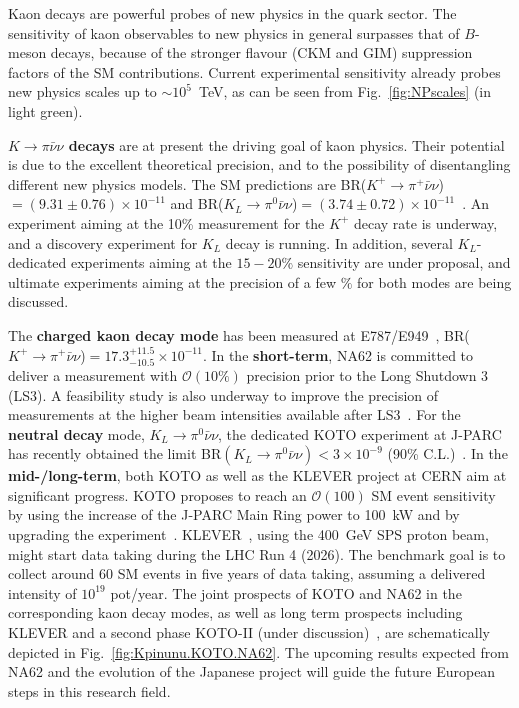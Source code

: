 Kaon decays are powerful probes of new physics in the quark sector. The sensitivity of kaon observables to new physics in general surpasses that of $B$-meson decays, because of the stronger flavour (CKM and GIM) suppression factors of the SM contributions.  
Current experimental sensitivity 
already probes new physics scales 
up to $\sim 10^5$~TeV, as can be seen from Fig.~\ref{fig:NPscales} (in light green). 


\textbf{${K \to \pi \bar \nu \nu}$ decays}   are at present the driving goal of kaon physics. Their potential is due to the excellent theoretical precision, 
and to the possibility of disentangling different new physics models.
The SM predictions are BR($K^+ \to \pi^+ \bar \nu \nu$)$=(9.31 \pm 0.76)\times 10^{-11}$ and 
BR($K_L \to \pi^0 \bar \nu \nu$)$=(3.74 \pm 0.72)\times 10^{-11}$~\cite{Buras:2015qea,SozziESPP19}. 
An experiment aiming at the 10\% measurement for the $K^+$ decay rate is underway, and a discovery experiment for $K_L$ decay is running. 
In addition, several $K_L$-dedicated experiments aiming at the $15-20\%$ sensitivity are under proposal, and ultimate experiments  aiming  at the precision of a few $\%$ for both modes are being discussed.  

The {\bf charged kaon decay mode} 
has been measured at E787/E949~\cite{Artamonov:2009sz},
BR($K^+ \to \pi^+ \bar \nu \nu$)$=17.3^{+11.5}_{-10.5} \times 10^{-11}$. 
In the {\bf short-term}, NA62 is committed to deliver a measurement 
with $\mathcal{O}(10\%)$ precision 
prior to the Long Shutdown 3 (LS3). A feasibility study is also underway
to improve the precision of measurements 
at the higher beam intensities available after LS3~\cite{SozziESPP19,NA62:Lazzeroni}. 
For the {\bf neutral decay} mode, $K_L \to \pi^0 \bar \nu \nu$, the dedicated KOTO experiment at J-PARC 
has recently obtained the limit BR$(K_L \to \pi^0 \bar \nu \nu) < 3 \times 10^{-9}$ (90\% C.L.)~\cite{Ahn:2018mvc}. In the {\bf mid-/long-term}, both KOTO as well as the KLEVER project at CERN aim at significant progress. 
KOTO proposes to reach an $\mathcal{O}(100)$ SM event sensitivity 
by using the increase of the J-PARC Main Ring power to 100~kW and by upgrading the experiment~\cite{KOTO_prospects}. 
KLEVER~\cite{Ambrosino:2019qvz}, using the 400~GeV 
SPS proton beam, might start data taking during the LHC Run 4 (2026). The benchmark goal is to collect around 60 SM events in five years of data taking, assuming a
delivered intensity of $10^{19}$ pot/year. 
The joint prospects of KOTO and NA62 in the corresponding kaon decay
modes, as well as long term prospects including KLEVER and a second
phase KOTO-II (under discussion)~\cite{JPARC_EPPSU_input, KOTO_II},
are schematically depicted in Fig.~\ref{fig:Kpinunu.KOTO.NA62}. The  upcoming results expected  from NA62  and the evolution of the Japanese project will guide the future European steps in this research field.

